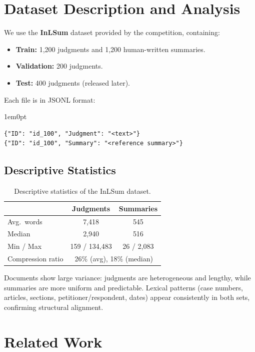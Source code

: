 \documentclass[sigconf]{acmart}
\begin{document}
\section{Dataset Description and Analysis}
We use the \textbf{InLSum} dataset provided by the competition, containing:
\begin{itemize}
  \item \textbf{Train:} 1,200 judgments and 1,200 human-written summaries.
  \item \textbf{Validation:} 200 judgments.
  \item \textbf{Test:} 400 judgments (released later).
\end{itemize}

Each file is in JSONL format:
\begin{adjustwidth}{1em}{0pt}
{\fontsize{9pt}{10pt}\selectfont
\begin{verbatim}
{"ID": "id_100", "Judgment": "<text>"}
{"ID": "id_100", "Summary": "<reference summary>"}
\end{verbatim}
}
\end{adjustwidth}

\subsection{Descriptive Statistics}
\begin{table}[h!]
  \centering
  \small
  \begin{tabular}{lcc}
    \toprule
     & \textbf{Judgments} & \textbf{Summaries} \\
    \midrule
    Avg.\ words & 7,418 & 545 \\
    Median & 2,940 & 516 \\
    Min / Max & 159 / 134,483 & 26 / 2,083 \\
    Compression ratio & \multicolumn{2}{c}{26\% (avg), 18\% (median)}\\
    \bottomrule
  \end{tabular}
  \caption{Descriptive statistics of the InLSum dataset.}
\end{table}

Documents show large variance: judgments are heterogeneous and lengthy, while summaries are more uniform and predictable.  
Lexical patterns (case numbers, articles, sections, petitioner/respondent, dates) appear consistently in both sets, confirming structural alignment.


\section{Related Work}
\end{document}
